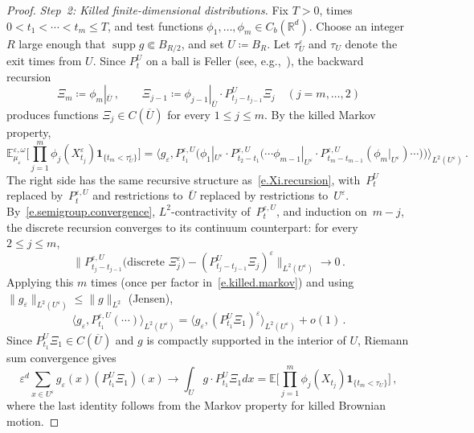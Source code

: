 \documentclass[11pt]{amsart}
\theoremstyle{plain}
\theoremstyle{definition}
\theoremstyle{remark}
\newcommand{\E}{\mathbb{E}}
\newcommand{\Rd}{\mathbb{R}^d}
\newcommand{\eps}{\varepsilon}
\begin{document}
\begin{proof}
		\emph{Step~2: Killed finite-dimensional distributions.}
		Fix $T > 0$, times $0 < t_1 < \cdots < t_m \le T$, and test functions $\phi_1, \ldots, \phi_m \in C_b(\Rd)$.
		Choose an integer $R$ large enough that $\operatorname{supp} g \Subset B_{R/2}$, and set $U \coloneqq B_R$.
		Let $\tau_U^\eps$ and $\tau_U$ denote the exit times from $U$.
		Since $P_t^U$ on a ball is Feller (see, e.g.,~\cite[Section~4.2]{EthierKurtz1986}), the backward recursion
		\begin{equation}
			\label{e.Xi.recursion}
			\Xi_m \coloneqq \phi_m|_{\overline{U}}\,,
			\qquad
			\Xi_{j-1} \coloneqq \phi_{j-1}|_{\overline{U}} \cdot P_{t_j - t_{j-1}}^U \Xi_j
			\quad (j = m, \ldots, 2)
		\end{equation}
		produces functions $\Xi_j \in C(\overline{U})$ for every $1 \le j \le m$.
		By the killed Markov property,
		\begin{equation}
			\label{e.killed.markov}
			\E_{\mu_\eps}^{\eps,\omega}
			\biggl[\prod_{j=1}^m \phi_j(X_{t_j}^\eps)\mathbf{1}_{\{t_m < \tau_U^\eps\}}\biggr]
			= \langle g_\eps, P_{t_1}^{\eps,U}\bigl(\phi_1|_{U^\eps} \cdot P_{t_2-t_1}^{\eps,U}\bigl(\cdots \phi_{m-1}|_{U^\eps} \cdot P_{t_m-t_{m-1}}^{\eps,U}(\phi_m|_{U^\eps})\cdots\bigr)\bigr) \rangle_{L^2(U^\eps)}\,.
		\end{equation}
		The right side has the same recursive structure as~\eqref{e.Xi.recursion}, with~$P_t^U$ replaced by~$P_t^{\eps,U}$ and restrictions to~$\overline{U}$ replaced by restrictions to~$U^\eps$.
		By~\eqref{e.semigroup.convergence}, $L^2$-contractivity of~$P_t^{\eps,U}$, and induction on~$m - j$, the discrete recursion converges to its continuum counterpart: for every~$2 \le j \le m$,
		\[
		\|P_{t_j-t_{j-1}}^{\eps,U}\bigl(\text{discrete } \Xi_j^\eps\bigr) - (P_{t_j-t_{j-1}}^U \Xi_j)^\eps\|_{L^2(U^\eps)} \to 0\,.
		\]
		Applying this $m$ times (once per factor in~\eqref{e.killed.markov}) and using $\|g_\eps\|_{L^2(U^\eps)} \le \|g\|_{L^2}$ (Jensen),
		\[
		\langle g_\eps, P_{t_1}^{\eps,U}(\cdots) \rangle_{L^2(U^\eps)}
		= \langle g_\eps, (P_{t_1}^U \Xi_1)^\eps \rangle_{L^2(U^\eps)} + o(1)\,.
		\]
		Since $P_{t_1}^U \Xi_1 \in C(\overline{U})$ and $g$ is compactly supported in the interior of $U$, Riemann sum convergence gives
		\[
		\eps^d \sum_{x \in U^\eps} g_\eps(x) (P_{t_1}^U \Xi_1)(x)
		\to \int_U g \cdot P_{t_1}^U \Xi_1 dx
		= \E\biggl[\prod_{j=1}^m \phi_j(X_{t_j})\mathbf{1}_{\{t_m < \tau_U\}}\biggr]\,,
		\]
		where the last identity follows from the Markov property for killed Brownian motion.
		
		\smallskip
		

\end{proof}
\end{document}
